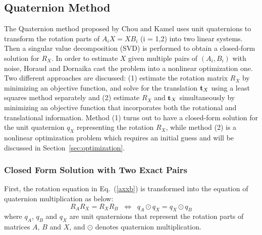 \documentclass[twocolumn,10pt]{asme2ej}
\newcommand{\ttt}{{\bf t}}
\begin{document}
\subsection{Quaternion Method }
\label{sec:quats}
The Quaternion method proposed by Chou and Kamel \cite{chou1988quaternions,chou1991finding} uses unit quaternions to transform the rotation parts of $A_{i}X = XB_{i}$ (i = 1,2) into two linear systems. Then a singular value decomposition (SVD) is performed to obtain a closed-form solution for $R_{X}$. In order to estimate $X$ given multiple pairs of $(A_{i}, B_{i})$ with noise, Horaud and Dornaika \cite{horaud1995hand} cast the problem into a nonlinear optimization one. Two different approaches are discussed: (1) estimate the rotation matrix $R_{X}$ by minimizing an objective function, and solve for the translation $\ttt_{X}$ using a least squares method separately and (2) estimate $R_{X}$ and $\ttt_{X}$ simultaneously by minimizing an objective function that incorporates both the rotational and translational information. Method (1) turns out to have a closed-form solution for the unit quaternion $q_{X}$ representing the rotation $R_{X}$, while method (2) is a nonlinear optimization problem which requires an initial guess and will be discussed in Section~\ref{sec:optimization}. 
\subsubsection{Closed Form Solution with Two Exact Pairs}
\label{sec:quat_method}
First, the rotation equation in Eq.~(\ref{axxb}) is transformed into the equation of quaternion multiplication as below:
\begin{equation}
R_{A}R_{X} = R_{X}R_{B} 
\; \;
\Leftrightarrow
\; \;
q_{A}\odot q_{X} = q_{X}\odot q_{B}
\label{Quaternion}
\end{equation} 
where $q_{A}$, $q_{B}$ and $q_{X}$ are
unit quaternions that represent the rotation parts of matrices $A$, $B$ and $X$, and $\odot$ denotes quaternion multiplication.
\end{document}
